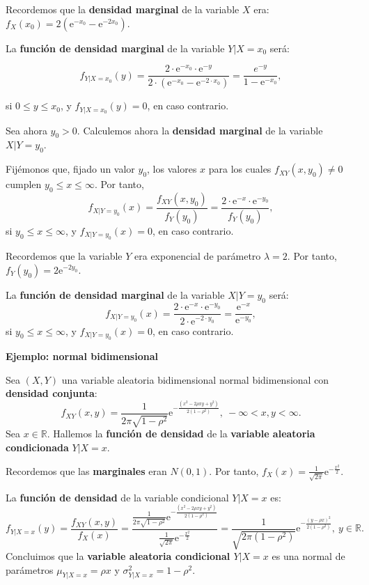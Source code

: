 \documentclass[]{book}
\begin{document}
Recordemos que la \textbf{densidad marginal} de la variable \(X\) era: \(f_X(x_0)=2\left(\mathrm{e}^{-x_0}-\mathrm{e}^{-2x_0}\right)\).

La \textbf{función de densidad marginal} de la variable \(Y|X=x_0\) será:

\[
f_{Y|X=x_0}(y)=\frac{2\cdot \mathrm{e}^{-x_0}\cdot \mathrm{e}^{-y}}{2\cdot \left(\mathrm{e}^{-x_0}-\mathrm{e}^{-2\cdot x_0}\right)}=\frac{e^{-y}}{1-\mathrm{e}^{-x_0}},
\]

si \(0\leq y\leq x_0\), y \(f_{Y|X=x_0}(y)=0\), en caso contrario.

Sea ahora \(y_0>0\). Calculemos ahora la \textbf{densidad marginal} de la variable \(X|Y=y_0\).

Fijémonos que, fijado un valor \(y_0\), los valores \(x\) para los cuales \(f_{XY}(x,y_0)\neq 0\) cumplen \(y_0\leq x\leq \infty\). Por tanto,
\[
f_{X|Y=y_0}(x)=\frac{f_{XY}(x,y_0)}{f_Y(y_0)}=\frac{2\cdot \mathrm{e}^{-x}\cdot \mathrm{e}^{-y_0}}{f_Y(y_0)},
\]
si \(y_0\leq x\leq \infty\), y \(f_{X|Y=y_0}(x)=0\), en caso contrario.

Recordemos que la variable \(Y\) era exponencial de parámetro \(\lambda=2\). Por tanto, \(f_Y(y_0)=2\mathrm{e}^{-2y_0}\).

La \textbf{función de densidad marginal} de la variable \(X|Y=y_0\) será:
\[
f_{X|Y=y_0}(x)=\frac{2\cdot \mathrm{e}^{-x}\cdot \mathrm{e}^{-y_0}}{2\cdot \mathrm{e}^{-2\cdot y_0}}=\frac{\mathrm{e}^{-x}}{\mathrm{e}^{-y_0}},
\]
si \(y_0\leq x\leq \infty\), y \(f_{X|Y=y_0}(x)=0\), en caso contrario.

\textbf{Ejemplo: normal bidimensional}

Sea \((X,Y)\) una variable aleatoria bidimensional normal bidimensional con \textbf{densidad conjunta}:
\[
f_{XY}(x,y)=\frac{1}{2\pi\sqrt{1-\rho^2}}\mathrm{e}^{-\frac{(x^2-2\rho xy+y^2)}{2(1-\rho^2)}},\ -\infty <x,y<\infty.
\]
Sea \(x\in\mathbb{R}\). Hallemos la \textbf{función de densidad} de la \textbf{variable aleatoria condicionada} \(Y|X=x\).

Recordemos que las \textbf{marginales} eran \(N(0,1)\). Por tanto, \(f_X(x)=\frac{1}{\sqrt{2\pi}}\mathrm{e}^{-\frac{x^2}{2}}.\)

La \textbf{función de densidad} de la variable condicional \(Y|X=x\) es:
\[
f_{Y|X=x}(y)=\frac{f_{XY}(x,y)}{f_X(x)}=\frac{\frac{1}{2\pi\sqrt{1-\rho^2}}\mathrm{e}^{-\frac{(x^2-2\rho xy+y^2)}{2(1-\rho^2)}}}{\frac{1}{\sqrt{2\pi}}\mathrm{e}^{-\frac{x^2}{2}}}=\frac{1}{\sqrt{2\pi (1-\rho^2)}}\mathrm{e}^{-\frac{(y-\rho x)^2}{2(1-\rho^2)}},\ y\in\mathbb{R}.
\]
Concluimos que la \textbf{variable aleatoria condicional \(Y|X=x\)} es una normal de parámetros \(\mu_{Y|X=x}=\rho x\) y \(\sigma_{Y|X=x}^2 =1-\rho^2\).
\end{document}
